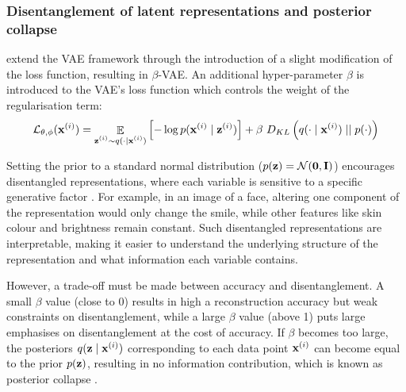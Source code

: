 \subsubsection{Disentanglement of latent representations and posterior collapse} \label{cha:disentang}
	\cite{higginsBetaVAELearningBasic2022} extend the VAE framework through the introduction of a slight modification of the loss function, resulting in $\beta$-VAE. An additional hyper-parameter $\beta$ is introduced to the VAE's loss function which controls the weight of the regularisation term:
	$$
	\mathcal{L}_{\theta, \phi} (\mathbf{x}^{(i)}) = \mathop{\mathbb{E}}_{\substack{\mathbf{z}^{(i)} \sim q (\cdot \mid \mathbf{x}^{(i)})}} \left[ -\log p (\mathbf{x}^{(i)} \mid \mathbf{z}^{(i)}) \right] + \beta~ D_{KL} \left(  q (\cdot \mid \mathbf{x}^{(i)})  \mid \mid  p(\cdot)  \right)
	$$
	
	Setting the prior to a standard normal distribution ($p(\mathbf{z}) = \mathcal{N}(\bm{\mathbf{0}}, \mathbf{I})$) encourages disentangled representations, where each variable is sensitive to a specific generative factor \citep{higginsBetaVAELearningBasic2022, bengioRepresentationLearningReview2013a}. For example, in an image of a face, altering one component of the representation would only change the smile, while other features like skin colour and brightness remain constant. Such disentangled representations are interpretable, making it easier to understand the underlying structure of the representation and what information each variable contains.
	
	However, a trade-off must be made between accuracy and disentanglement. A small $\beta$ value (close to 0) results in high a reconstruction accuracy but weak constraints on disentanglement, while a large $\beta$ value (above 1) puts large emphasises on disentanglement at the cost of accuracy. If $\beta$ becomes too large, the posteriors $q (\mathbf{z} \mid \mathbf{x}^{(i)})$ corresponding to each data point $\mathbf{x}^{(i)}$ can become equal to the prior $p(\mathbf{z})$, resulting in no information contribution, which is known as posterior collapse \citep{lucasUnderstandingPosteriorCollapse2022}.
	

	
	
	

%
%
	
